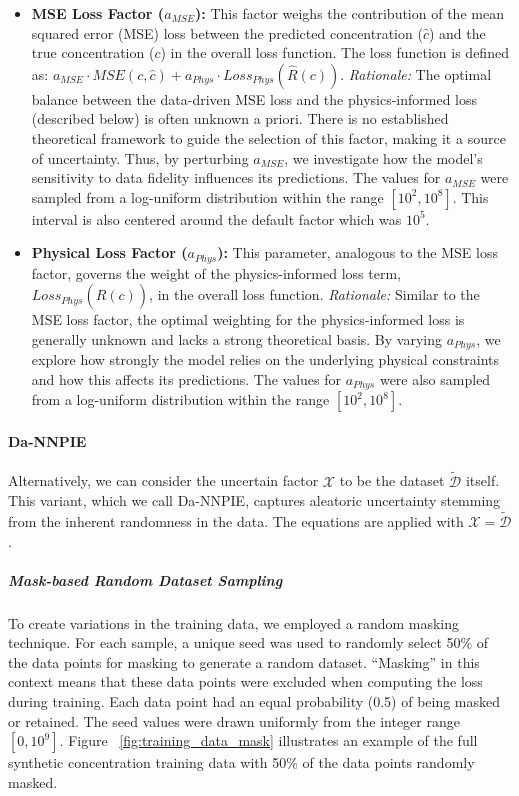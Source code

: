 \begin{itemize}
    \item \textbf{MSE Loss Factor ($a_{MSE}$):} This factor weighs the contribution of the mean squared error (MSE) loss between the predicted concentration ($\hat{c}$) and the true concentration ($c$) in the overall loss function. The loss function is defined as: $a_{MSE} \cdot MSE(c, \hat{c}) + a_{Phys} \cdot Loss_{Phys}(\hat{R}(c))$. \textit{Rationale:} The optimal balance between the data-driven MSE loss and the physics-informed loss (described below) is often unknown a priori. There is no established theoretical framework to guide the selection of this factor, making it a source of uncertainty. Thus, by perturbing $a_{MSE}$, we investigate how the model's sensitivity to data fidelity influences its predictions. The values for $a_{MSE}$ were sampled from a log-uniform distribution within the range $[10^2, 10^8]$. This interval is also centered around the default factor which was $10^5$.
    \item \textbf{Physical Loss Factor ($a_{Phys}$):} This parameter, analogous to the MSE loss factor, governs the weight of the physics-informed loss term, $Loss_{Phys}(\hat{R}(c))$, in the overall loss function. \textit{Rationale:} Similar to the MSE loss factor, the optimal weighting for the physics-informed loss is generally unknown and lacks a strong theoretical basis. By varying $a_{Phys}$, we explore how strongly the model relies on the underlying physical constraints and how this affects its predictions. The values for $a_{Phys}$ were also sampled from a log-uniform distribution within the range $[10^2, 10^8]$.
\end{itemize}



\paragraph{Da-NNPIE}

Alternatively, we can consider the uncertain factor $\mathcal{X}$ to be the dataset $\tilde{\mathcal{D}}$ itself. This variant, which we call Da-NNPIE, captures aleatoric uncertainty stemming from the inherent randomness in the data. The equations are applied with $\mathcal{X} = \tilde{\mathcal{D}}$.


\subparagraph{Mask-based Random Dataset Sampling}

To create variations in the training data, we employed a random masking technique. For each sample, a unique seed was used to randomly select 50\% of the data points for masking to generate a random dataset. ``Masking'' in this context means that these data points were excluded when computing the loss during training. Each data point had an equal probability (0.5) of being masked or retained. The seed values were drawn uniformly from the integer range $[0, 10^9]$. Figure ~\vref{fig:training_data_mask} illustrates an example of the full synthetic concentration training data with 50\% of the data points randomly masked.

